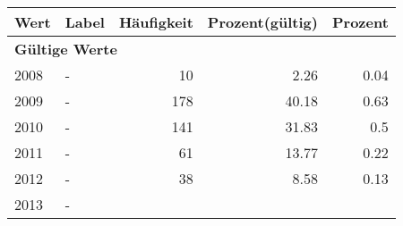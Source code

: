      \begin{longtable}{lXrrr}
     \toprule
     \textbf{Wert} & \textbf{Label} & \textbf{Häufigkeit} & \textbf{Prozent(gültig)} & \textbf{Prozent} \\
     \endhead
     \midrule
     \multicolumn{5}{l}{\textbf{Gültige Werte}}\\

     2008 &
     \multicolumn{1}{X}{ -  } &


       \num{10} &
       \num[round-mode=places,round-precision=2]{2,26} &
         \num[round-mode=places,round-precision=2]{0,04} \\

     2009 &
     \multicolumn{1}{X}{ -  } &


       \num{178} &
       \num[round-mode=places,round-precision=2]{40,18} &
         \num[round-mode=places,round-precision=2]{0,63} \\

     2010 &
     \multicolumn{1}{X}{ -  } &


       \num{141} &
       \num[round-mode=places,round-precision=2]{31,83} &
         \num[round-mode=places,round-precision=2]{0,5} \\

     2011 &
     \multicolumn{1}{X}{ -  } &


       \num{61} &
       \num[round-mode=places,round-precision=2]{13,77} &
         \num[round-mode=places,round-precision=2]{0,22} \\

     2012 &
     \multicolumn{1}{X}{ -  } &


       \num{38} &
       \num[round-mode=places,round-precision=2]{8,58} &
         \num[round-mode=places,round-precision=2]{0,13} \\

     2013 &
     \multicolumn{1}{X}{ -  } &



\end{longtable}
